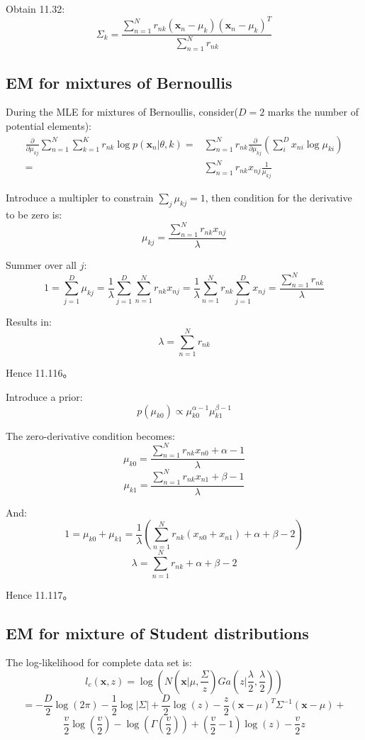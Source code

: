 \documentclass[UTF8]{ctexart}
\begin{document}
Obtain 11.32:
$$\Sigma_{k} = \frac{\sum_{n=1}^{N}r_{nk}(\textbf{x}_{n}-\mu_{k})(\textbf{x}_{n}-\mu_{k})^{T}}{\sum_{n=1}^{N}r_{nk}}$$

\subsection{EM for mixtures of Bernoullis}
During the MLE for mixtures of Bernoullis, consider($D=2$ marks the number of  potential elements):
\begin{align}
\frac{\partial}{\partial \mu_{kj}}\sum_{n=1}^{N}\sum_{k=1}^{K}r_{nk}\log p(\textbf{x}_{n}|\theta,k)=&\sum_{n=1}^{N}r_{nk}\frac{\partial}{\partial \mu_{kj}}(\sum_{i}^{D}x_{ni}\log \mu_{ki})\nonumber \\
=&\sum_{n=1}^{N}r_{nk}x_{nj}\frac{1}{\mu_{kj}}\nonumber
\end{align}

Introduce a multipler to constrain $\sum_{j}\mu_{kj}=1$, then condition for the derivative to be zero is:
$$\mu_{kj}=\frac{\sum_{n=1}^{N}r_{nk}x_{nj}}{\lambda}$$

Summer over all $j$:
$$1=\sum_{j=1}^{D}\mu_{kj} = \frac{1}{\lambda}\sum_{j=1}^{D}\sum_{n=1}^{N}r_{nk}x_{nj}=\frac{1}{\lambda}\sum_{n=1}^{N}r_{nk}\sum_{j=1}^{D}x_{nj}=\frac{\sum_{n=1}^{N}r_{nk}}{\lambda}$$

Results in:
$$\lambda = \sum_{n=1}^{N}r_{nk}$$

Hence 11.116。

Introduce a prior:
$$p(\mu_{k0})\propto \mu_{k0}^{\alpha-1}\mu_{k1}^{\beta-1}$$

The zero-derivative condition becomes:
$$\mu_{k0}=\frac{\sum_{n=1}^{N}r_{nk}x_{n0}+\alpha-1}{\lambda}$$
$$\mu_{k1}=\frac{\sum_{n=1}^{N}r_{nk}x_{n1}+\beta-1}{\lambda}$$

And:
$$1=\mu_{k0}+\mu_{k1}=\frac{1}{\lambda}(\sum_{n=1}^{N}r_{nk}(x_{n0}+x_{n1})+\alpha+\beta-2)$$
$$\lambda = \sum_{n=1}^{N}r_{nk}+\alpha+\beta-2$$

Hence 11.117。

\subsection{EM for mixture of Student distributions}
The log-likelihood for complete data set is:
$$l_{c}(\textbf{x},z)=\log(N(\textbf{x}|\mu,\frac{\Sigma}{z})Ga(z|\frac{\lambda}{2},\frac{\lambda}{2}))$$
$$=-\frac{D}{2}\log(2\pi)-\frac{1}{2}\log|\Sigma|+\frac{D}{2}\log(z)-\frac{z}{2}(\textbf{x}-\mu)^{T}\Sigma^{-1}(\textbf{x}-\mu)+$$
$$\frac{v}{2}\log (\frac{v}{2}) -\log(\Gamma(\frac{v}{2}))+(\frac{v}{2}-1)\log (z) - \frac{v}{2}z$$
\end{document}
